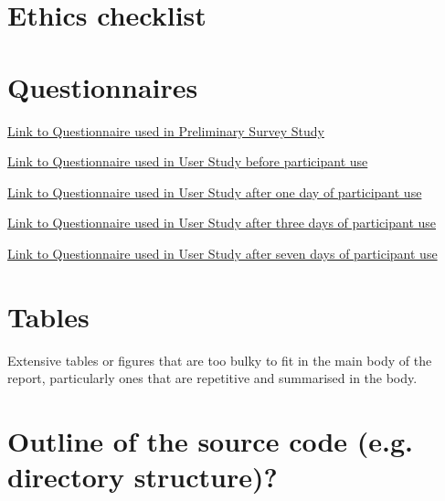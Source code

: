 \documentclass{l4proj}
\begin{document}
\begin{appendices}

\chapter{Ethics checklist}


\chapter{Questionnaires}
\begin{description}
    \item \href{https://docs.google.com/forms/d/1pakX7XYVLeoAOoYjkXVDSh09DWRrcNKFbN93KbzdtMg/prefill}{Link to Questionnaire used in Preliminary Survey Study}
\item
    \item \href{https://docs.google.com/forms/d/1JbD9k1n20KKGAkHvTEXJXE3pGRheN1uez2E0XOwcXZU/prefill}{Link to Questionnaire used in User Study before participant use}
\item
    \item \href{https://docs.google.com/forms/d/1sm2wlPlcC8mvK1OyvnOXUq5_tHZXC1h9BahmidPfutQ/prefill}{Link to Questionnaire used in User Study after one day of participant use}
\item
    \item \href{https://docs.google.com/forms/d/1heEV_uBCCTCK5g-J18M_eL7aD9sfJnWIl7B-Aie7A4c/prefill}{Link to Questionnaire used in User Study after three days of participant use}
\item
    \item \href{https://docs.google.com/forms/d/1NoNhfJRtZiw-utZUCW7sfjN9cYZxTzjtm8tA7g0-hdo/prefill}{Link to Questionnaire used in User Study after seven days of participant use}
\end{description}


\chapter{Tables}
Extensive tables or figures that are too bulky to fit in the main body of the report, particularly ones that are repetitive and summarised in the body.


\chapter{Outline of the source code (e.g. directory structure)?}



\end{appendices}
\end{document}
